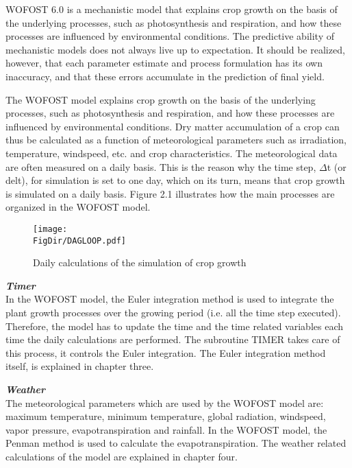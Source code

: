 WOFOST 6.0 is a mechanistic model that explains crop growth on the basis of the 
underlying processes, such as photosynthesis and respiration, and how these processes are
influenced by environmental conditions. The predictive ability of mechanistic models does
not always live up to expectation. It should be realized, however, that each parame\-ter
estimate and process formulation has its own inaccura\-cy, and that these errors accumulate
in the prediction of final yield.

The WOFOST model explains crop growth on the basis of the underly\-ing processes, such
as photosynthesis and respira\-tion, and how these processes are influenced by environ\-mental 
conditions. Dry matter accumulation of a crop can thus be calculated as a function
of meteorological parameters such as irradiation, temperature, windspeed, etc. and crop
characteristics. The meteorological data are often measured on a daily basis. This is the
reason why the time step, $\Delta$t (or delt), for simulation is set to one day, which on its turn,
means that crop growth is simulated on a daily basis. Figure 2.1 illustrates how the main
processes are organized in the WOFOST model.

\begin{figure}[htbp]
\centering
\texttt{[image: \\FigDir/DAGLOOP.pdf]}
\caption{Daily calculations of the simulation of crop growth}
\end{figure}

{\bf {\it Timer}}\\
In the WOFOST model, the Euler integration method is used to integrate the plant growth
processes over the growing period (i.e. all the time step executed). Therefore, the model
has to update the time and the time related variables each time the daily calcula\-tions are
performed. The subroutine TIMER takes care of this process, it controls the Euler
integration. The Euler integration method itself, is explained in chapter three.

{\bf {\it Weather}}\\
The meteorological parameters which are used by the WOFOST model are: maxi\-mum
temperature, minimum temperature, global radiation, windspeed, vapor pressure,
evapotranspiration and rainfall. In the WOFOST model, the Penman method is used to
calculate the evapotr\-anspiration. The weather related calculations of the model are
explained in chapter four.

